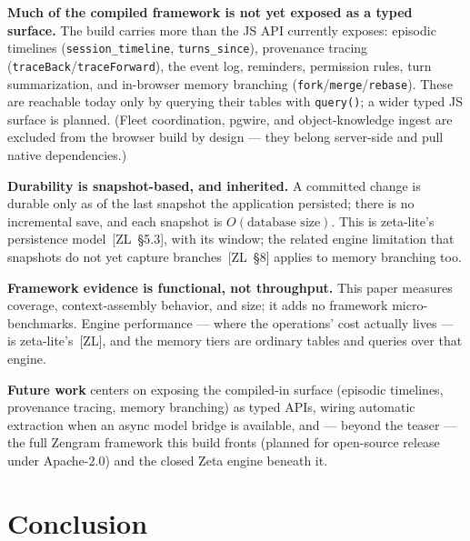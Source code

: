 \documentclass[11pt]{article}
\newcommand{\code}[1]{\texttt{#1}}
\begin{document}
\textbf{Much of the compiled framework is not yet exposed as a typed surface.} The
build carries more than the JS API currently exposes: episodic timelines
(\code{session\_timeline}, \code{turns\_since}), provenance tracing
(\code{traceBack}/\code{traceForward}), the event log, reminders, permission rules,
turn summarization, and in-browser memory branching
(\code{fork}/\code{merge}/\code{rebase}). These are reachable today only by
querying their tables with \code{query()}; a wider typed JS surface is planned.
(Fleet coordination, pgwire, and object-knowledge ingest are excluded from the
browser build by design --- they belong server-side and pull native dependencies.)

\textbf{Durability is snapshot-based, and inherited.} A committed change is durable
only as of the last snapshot the application persisted; there is no incremental
save, and each snapshot is $O(\text{database size})$. This is zeta-lite's
persistence model~[ZL~\S5.3], with its window; the related engine limitation that
snapshots do not yet capture branches~[ZL~\S8] applies to memory branching too.

\textbf{Framework evidence is functional, not throughput.} This paper measures
coverage, context-assembly behavior, and size; it adds no framework
micro-benchmarks. Engine performance --- where the operations' cost actually lives
--- is zeta-lite's~[ZL], and the memory tiers are ordinary tables and queries over
that engine.

\textbf{Future work} centers on exposing the compiled-in surface (episodic
timelines, provenance tracing, memory branching) as typed APIs, wiring automatic
extraction when an async model bridge is available, and --- beyond the teaser ---
the full Zengram framework this build fronts (planned for open-source release under
Apache-2.0) and the closed Zeta engine beneath it.

\section{Conclusion}
\end{document}
